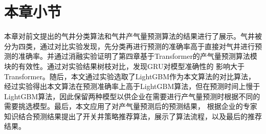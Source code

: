   \section{本章小节}
  本章对前文提出的气井分类算法和气井产气量预测算法的结果进行了展示。气井被分为四类，通过对比实验发现，先分类再进行预测的准确率高于直接对气井进行预测的准确率。并通过消融实验证明了第四章基于Transformer的产气量预测算法模块的有效性。通过对实验结果树枝对比，发现GRU对模型准确性的
  影响大于Transformer。随后，本文通过实验选取了LightGBM作为本文算法的对比算法，经过实验得出本文算法在预测准确率上高于LightGBM算法，但在预测时间上慢于LightGBM算法，因此保留两种模型以供企业在需要进行产气量预测时根据不同的需要挑选模型。最后，本文应用了对产气量预测后的预测结果，
  根据企业的专家知识结合预测结果提出了开关井策略推荐算法，展示了算法流程，以及最后的推荐结果。